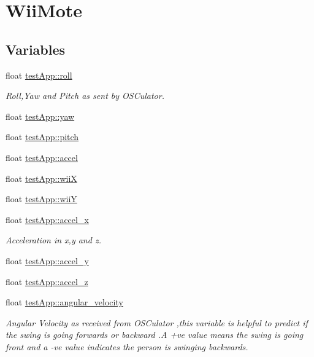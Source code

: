 \hypertarget{group___wii_mote}{\section{Wii\-Mote}
\label{group___wii_mote}
}
\subsection*{Variables}
\begin{DoxyCompactItemize}
\item 
float \hyperlink{group___wii_mote_ga020730abb55e6ae6d0a28edee19050e0}{test\-App\-::roll}
\begin{DoxyCompactList}\small\item\em Roll,Yaw and Pitch as sent by O\-S\-Culator. \end{DoxyCompactList}\item 
float \hyperlink{group___wii_mote_ga865985f78dd5def3ed20c87b9fc772b6}{test\-App\-::yaw}
\item 
float \hyperlink{group___wii_mote_gaabbebeb113838374f659e86a0355b260}{test\-App\-::pitch}
\item 
float \hyperlink{group___wii_mote_ga8e560e923c82d421857538e4a5927542}{test\-App\-::accel}
\item 
float \hyperlink{group___wii_mote_ga7a77e8633c3a94e3e409a33a5cd9ae3f}{test\-App\-::wii\-X}
\item 
float \hyperlink{group___wii_mote_ga5ae41896388ae16ee530beca5333e02a}{test\-App\-::wii\-Y}
\item 
float \hyperlink{group___wii_mote_gad1738ff98d225f80b853a9ddc9f5a116}{test\-App\-::accel\-\_\-x}
\begin{DoxyCompactList}\small\item\em Acceleration in x,y and z. \end{DoxyCompactList}\item 
float \hyperlink{group___wii_mote_ga204bcb2412a70a65ebea6008ee8c4eb0}{test\-App\-::accel\-\_\-y}
\item 
float \hyperlink{group___wii_mote_ga61dbdd5c0b868568dde40a52f6e56054}{test\-App\-::accel\-\_\-z}
\item 
float \hyperlink{group___wii_mote_ga98e05c3206ff95fccfebfc9df5317598}{test\-App\-::angular\-\_\-velocity}
\begin{DoxyCompactList}\small\item\em Angular Velocity as received from O\-S\-Culator ,this variable is helpful to predict if the swing is going forwards or backward .A +ve value means the swing is going front and a -\/ve value indicates the person is swinging backwards. \end{DoxyCompactList}\item 

\end{DoxyCompactItemize}
